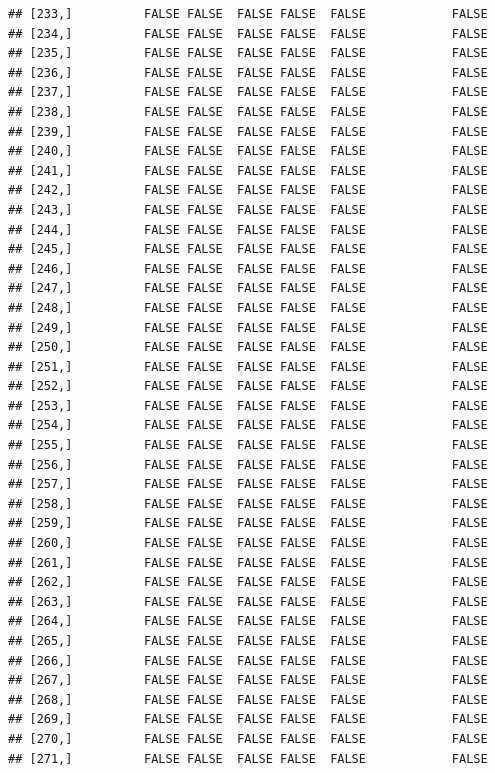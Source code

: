 \documentclass[
  english,
  man,floatsintext]{apa6}
\begin{document}
\begin{verbatim}
## [233,]          FALSE FALSE  FALSE FALSE  FALSE            FALSE
## [234,]          FALSE FALSE  FALSE FALSE  FALSE            FALSE
## [235,]          FALSE FALSE  FALSE FALSE  FALSE            FALSE
## [236,]          FALSE FALSE  FALSE FALSE  FALSE            FALSE
## [237,]          FALSE FALSE  FALSE FALSE  FALSE            FALSE
## [238,]          FALSE FALSE  FALSE FALSE  FALSE            FALSE
## [239,]          FALSE FALSE  FALSE FALSE  FALSE            FALSE
## [240,]          FALSE FALSE  FALSE FALSE  FALSE            FALSE
## [241,]          FALSE FALSE  FALSE FALSE  FALSE            FALSE
## [242,]          FALSE FALSE  FALSE FALSE  FALSE            FALSE
## [243,]          FALSE FALSE  FALSE FALSE  FALSE            FALSE
## [244,]          FALSE FALSE  FALSE FALSE  FALSE            FALSE
## [245,]          FALSE FALSE  FALSE FALSE  FALSE            FALSE
## [246,]          FALSE FALSE  FALSE FALSE  FALSE            FALSE
## [247,]          FALSE FALSE  FALSE FALSE  FALSE            FALSE
## [248,]          FALSE FALSE  FALSE FALSE  FALSE            FALSE
## [249,]          FALSE FALSE  FALSE FALSE  FALSE            FALSE
## [250,]          FALSE FALSE  FALSE FALSE  FALSE            FALSE
## [251,]          FALSE FALSE  FALSE FALSE  FALSE            FALSE
## [252,]          FALSE FALSE  FALSE FALSE  FALSE            FALSE
## [253,]          FALSE FALSE  FALSE FALSE  FALSE            FALSE
## [254,]          FALSE FALSE  FALSE FALSE  FALSE            FALSE
## [255,]          FALSE FALSE  FALSE FALSE  FALSE            FALSE
## [256,]          FALSE FALSE  FALSE FALSE  FALSE            FALSE
## [257,]          FALSE FALSE  FALSE FALSE  FALSE            FALSE
## [258,]          FALSE FALSE  FALSE FALSE  FALSE            FALSE
## [259,]          FALSE FALSE  FALSE FALSE  FALSE            FALSE
## [260,]          FALSE FALSE  FALSE FALSE  FALSE            FALSE
## [261,]          FALSE FALSE  FALSE FALSE  FALSE            FALSE
## [262,]          FALSE FALSE  FALSE FALSE  FALSE            FALSE
## [263,]          FALSE FALSE  FALSE FALSE  FALSE            FALSE
## [264,]          FALSE FALSE  FALSE FALSE  FALSE            FALSE
## [265,]          FALSE FALSE  FALSE FALSE  FALSE            FALSE
## [266,]          FALSE FALSE  FALSE FALSE  FALSE            FALSE
## [267,]          FALSE FALSE  FALSE FALSE  FALSE            FALSE
## [268,]          FALSE FALSE  FALSE FALSE  FALSE            FALSE
## [269,]          FALSE FALSE  FALSE FALSE  FALSE            FALSE
## [270,]          FALSE FALSE  FALSE FALSE  FALSE            FALSE
## [271,]          FALSE FALSE  FALSE FALSE  FALSE            FALSE

\end{verbatim}
\end{document}
